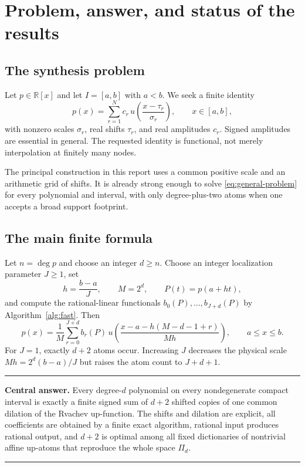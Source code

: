 \documentclass[11pt,oneside]{article}
\theoremstyle{definition}
\theoremstyle{remark}
\newcommand{\R}{\mathbb R}
\newenvironment{resultbox}{%
  \par\smallskip\noindent\begin{center}\begin{minipage}{0.94\textwidth}%
  \color{black}\hrule\vspace{0.55em}\small
}{%
  \vspace{0.55em}\hrule\end{minipage}\end{center}\smallskip
}
\begin{document}
\tableofcontents
\newpage

\section{Problem, answer, and status of the results}

\subsection{The synthesis problem}
Let $p\in\R[x]$ and let $I=[a,b]$ with $a<b$.  We seek a finite identity
\begin{equation}
 p(x)=\sum_{r=1}^{N}c_r\,
 u\!\left(\frac{x-\tau_r}{\sigma_r}\right),
 \qquad x\in[a,b],                                      \label{eq:general-problem}
\end{equation}
with nonzero scales $\sigma_r$, real shifts $\tau_r$, and real amplitudes $c_r$.  Signed amplitudes are essential in general.  The requested identity is functional, not merely interpolation at finitely many nodes.

The principal construction in this report uses a common positive scale and an arithmetic grid of shifts.  It is already strong enough to solve \eqref{eq:general-problem} for every polynomial and interval, with only degree-plus-two atoms when one accepts a broad support footprint.

\subsection{The main finite formula}
Let $n=\deg p$ and choose an integer $d\ge n$.  Choose an integer localization parameter $J\ge1$, set
\begin{equation}
 h=\frac{b-a}{J},\qquad M=2^d,\qquad P(t)=p(a+ht),        \label{eq:normalization}
\end{equation}
and compute the rational-linear functionals $b_0(P),\ldots,b_{J+d}(P)$ by Algorithm~\ref{alg:fast}.  Then
\begin{equation}
 \boxed{
 p(x)=\frac1M\sum_{r=0}^{J+d}b_r(P)\,
 u\!\left(
 \frac{x-a-h(M-d-1+r)}{Mh}
 \right),\qquad a\le x\le b.}                           \label{eq:main-physical}
\end{equation}
For $J=1$, exactly $d+2$ atoms occur.  Increasing $J$ decreases the physical scale $Mh=2^d(b-a)/J$ but raises the atom count to $J+d+1$.

\begin{resultbox}
\textbf{Central answer.}  Every degree-$d$ polynomial on every nondegenerate compact interval is exactly a finite signed sum of $d+2$ shifted copies of one common dilation of the Rvachev up-function.  The shifts and dilation are explicit, all coefficients are obtained by a finite exact algorithm, rational input produces rational output, and $d+2$ is optimal among all fixed dictionaries of nontrivial affine up-atoms that reproduce the whole space $\Pi_d$.
\end{resultbox}
\end{document}
